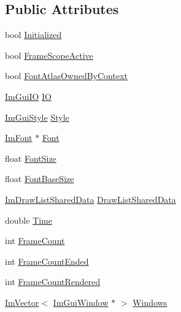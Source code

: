 \subsection*{Public Attributes}
\begin{DoxyCompactItemize}
\item 
bool \mbox{\hyperlink{struct_im_gui_context_a71b32432f5c4658b4772b293640a66c0}{Initialized}}
\item 
bool \mbox{\hyperlink{struct_im_gui_context_aa79e158ac0aeaf53cc16e9277fd4431b}{Frame\+Scope\+Active}}
\item 
bool \mbox{\hyperlink{struct_im_gui_context_a06996a09451ec85ef2a34c4de4280441}{Font\+Atlas\+Owned\+By\+Context}}
\item 
\mbox{\hyperlink{struct_im_gui_i_o}{Im\+Gui\+IO}} \mbox{\hyperlink{struct_im_gui_context_add4fdcc8c6a437d8f8e7c837418be83c}{IO}}
\item 
\mbox{\hyperlink{struct_im_gui_style}{Im\+Gui\+Style}} \mbox{\hyperlink{struct_im_gui_context_a2e682502e1a3d2c399171dd3c4fc969d}{Style}}
\item 
\mbox{\hyperlink{struct_im_font}{Im\+Font}} $\ast$ \mbox{\hyperlink{struct_im_gui_context_aec64e774018a7d74515baeb9e06fb4e3}{Font}}
\item 
float \mbox{\hyperlink{struct_im_gui_context_af4022d1866887cdc400131fc6a65b200}{Font\+Size}}
\item 
float \mbox{\hyperlink{struct_im_gui_context_a0fcbda57d25b80111283ed7305ee3ee8}{Font\+Base\+Size}}
\item 
\mbox{\hyperlink{struct_im_draw_list_shared_data}{Im\+Draw\+List\+Shared\+Data}} \mbox{\hyperlink{struct_im_gui_context_a71045e6879ff2d074836273ba00674e6}{Draw\+List\+Shared\+Data}}
\item 
double \mbox{\hyperlink{struct_im_gui_context_a2b4eb26da74e5b80bdc7efa34d267570}{Time}}
\item 
int \mbox{\hyperlink{struct_im_gui_context_ab9a1f3b3f15f0a6c5f29aef85f1a8ea2}{Frame\+Count}}
\item 
int \mbox{\hyperlink{struct_im_gui_context_aa4cc3099c789be981d665c617b6d78a9}{Frame\+Count\+Ended}}
\item 
int \mbox{\hyperlink{struct_im_gui_context_a64a96ecd43f4b10c1fec8eb3fc9bff89}{Frame\+Count\+Rendered}}
\item 
\mbox{\hyperlink{class_im_vector}{Im\+Vector}}$<$ \mbox{\hyperlink{struct_im_gui_window}{Im\+Gui\+Window}} $\ast$ $>$ \mbox{\hyperlink{struct_im_gui_context_a0f59a9a861d097be066c6cc106e40f3e}{Windows}}
\item 

\end{DoxyCompactItemize}
